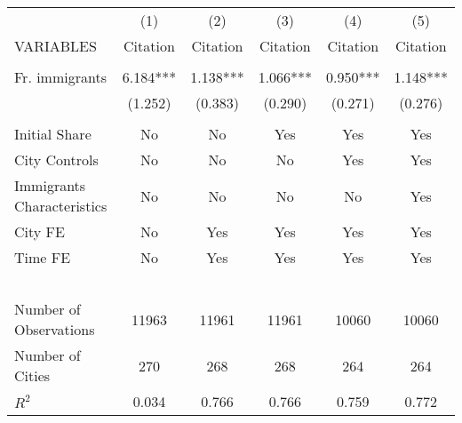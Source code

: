 \begin{tabular}{lccccc} \hline
 & (1) & (2) & (3) & (4) & (5) \\
VARIABLES & Citation & Citation & Citation & Citation & Citation \\ \hline
 &  &  &  &  &  \\
Fr. immigrants & 6.184*** & 1.138*** & 1.066*** & 0.950*** & 1.148*** \\
 & (1.252) & (0.383) & (0.290) & (0.271) & (0.276) \\
 &  &  &  &  &  \\
Initial Share & No & No & Yes & Yes & Yes \\
City Controls & No & No & No & Yes & Yes \\
Immigrants Characteristics & No & No & No & No & Yes \\
City FE & No & Yes & Yes & Yes & Yes \\
Time FE & No & Yes & Yes & Yes & Yes \\
~ & ~ & ~ & ~ & ~ & ~ \\
Number of Observations & 11963 & 11961 & 11961 & 10060 & 10060 \\
Number of Cities & 270 & 268 & 268 & 264 & 264 \\
 $ R^2$ & 0.034 & 0.766 & 0.766 & 0.759 & 0.772 \\ \hline
\end{tabular}
